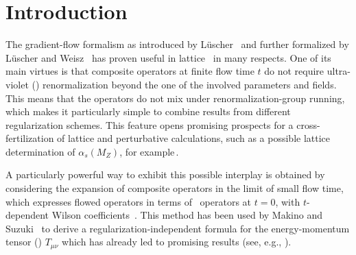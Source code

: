 \section{Introduction}\label{sec:intro}

The gradient-flow formalism as introduced by
L\"uscher~\cite{Luscher:2010iy} and further formalized by L\"uscher and
Weisz~\cite{Luscher:2011bx} has proven useful in lattice \qcd\ in many
respects. One of its main virtues is that composite operators at finite
flow time $t$ do not require ultra-violet () renormalization
beyond the one of the involved parameters and fields. This means that
the operators do not mix under renormalization-group running, which
makes it particularly simple to combine results from different
regularization schemes. This feature opens promising prospects for a
cross-fertilization of lattice and perturbative calculations, such as a
possible lattice determination of $\alpha_s(M_Z)$, for
example\,\cite{Harlander:2016vzb}.

A particularly powerful way to exhibit this possible interplay is
obtained by considering the expansion of composite operators in the
limit of small flow time, which expresses flowed operators in terms of
\qcd\ operators at $t=0$, with $t$-dependent Wilson
coefficients~\cite{Luscher:2011bx}. This method has been used by Makino
and Suzuki~\cite{Suzuki:2013gza,Makino:2014taa} to derive a
regularization-independent formula for the energy-momentum tensor (\emt)
$T_{\mu\nu}$ which has already led to promising results (see, e.g.,
).

